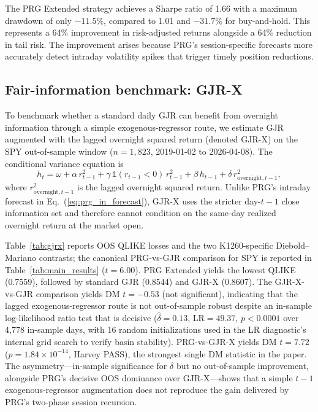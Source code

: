 \documentclass[11pt,a4paper]{article}
\begin{document}
The PRG Extended strategy achieves a Sharpe ratio of 1.66 with a maximum drawdown of only $-11.5\%$, compared to 1.01 and $-31.7\%$ for buy-and-hold. This represents a 64\% improvement in risk-adjusted returns alongside a 64\% reduction in tail risk. The improvement arises because PRG's session-specific forecasts more accurately detect intraday volatility spikes that trigger timely position reductions.

\subsection{Fair-information benchmark: GJR-X}
\label{sec:gjrx}

To benchmark whether a standard daily GJR can benefit from overnight information through a simple exogenous-regressor route, we estimate GJR augmented with the lagged overnight squared return (denoted GJR-X) on the SPY out-of-sample window ($n=1{,}823$, 2019-01-02 to 2026-04-08). The conditional variance equation is
\begin{equation}
    h_t = \omega + \alpha\, r^2_{t-1} + \gamma\, \mathbb{1}(r_{t-1} < 0)\, r^2_{t-1} + \beta\, h_{t-1} + \delta\, r^2_{\text{overnight},t-1},
    \label{eq:gjrx}
\end{equation}
where $r^2_{\text{overnight},t-1}$ is the lagged overnight squared return. Unlike PRG's intraday forecast in Eq.~(\ref{eq:prg_in_forecast}), GJR-X uses the stricter day-$t{-}1$ close information set and therefore cannot condition on the same-day realized overnight return at the market open.

Table~\ref{tab:gjrx} reports OOS QLIKE losses and the two K1260-specific Diebold--Mariano contrasts; the canonical PRG-vs-GJR comparison for SPY is reported in Table~\ref{tab:main_results} ($t = 6.00$). PRG Extended yields the lowest QLIKE (0.7559), followed by standard GJR (0.8544) and GJR-X (0.8607). The GJR-X-vs-GJR comparison yields DM $t = -0.53$ (not significant), indicating that the lagged exogenous-regressor route is not out-of-sample robust despite an in-sample log-likelihood ratio test that is decisive ($\hat{\delta} = 0.13$, $\mathrm{LR} = 49.37$, $p < 0.0001$ over 4{,}778 in-sample days, with 16 random initializations used in the LR diagnostic's internal grid search to verify basin stability). PRG-vs-GJR-X yields DM $t = 7.72$ ($p = 1.84 \times 10^{-14}$, Harvey PASS), the strongest single DM statistic in the paper. The asymmetry---in-sample significance for $\delta$ but no out-of-sample improvement, alongside PRG's decisive OOS dominance over GJR-X---shows that a simple $t{-}1$ exogenous-regressor augmentation does not reproduce the gain delivered by PRG's two-phase session recursion.
\end{document}
